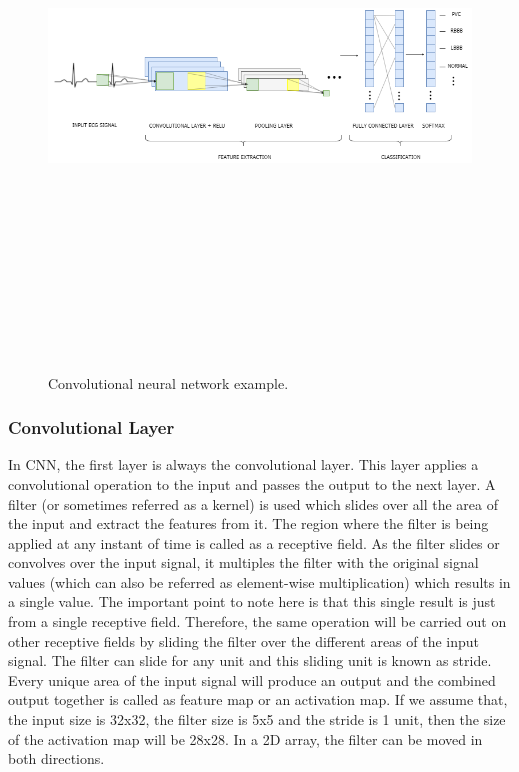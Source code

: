 \begin{figure}[htpb]
	\centering
	\includegraphics[width=15cm,height=15cm,keepaspectratio=true]{images/cnn_1d}
	\caption{
		Convolutional neural network example.
	}
	\label{fig:cnn_1d}
\end{figure}

\subsubsection{Convolutional Layer}
In CNN, the first layer is always the convolutional layer. This layer applies a convolutional operation to the input and passes the output to the next layer. A filter (or sometimes referred as a kernel) is used which slides over all the area of the input and extract the features from it. The region where the filter is being applied at any instant of time is called as a receptive field. As the filter slides or convolves over the input signal, it multiples the filter with the original signal values (which can also be referred as element-wise multiplication) which results in a single value. The important point to note here is that this single result is just from a single receptive field. Therefore, the same operation will be carried out on other receptive fields by sliding the filter over the different areas of the input signal. The filter can slide for any unit and this sliding unit is known as stride. Every unique area of the input signal will produce an output and the combined output together is called as feature map or an activation map.  If we assume that, the input size is 32x32, the filter size is 5x5 and the stride is 1 unit, then the size of the activation map will be 28x28. In a 2D array, the filter can be moved in both directions.

